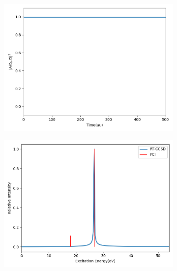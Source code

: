 \begin{figure}
     \centering
     \begin{subfigure}{0.47\textwidth}
         \centering
         \includegraphics[width=\textwidth]{ch4/Figs/10-1.png}
     \end{subfigure}
     \hfill
     \begin{subfigure}{0.47\textwidth}
         \centering
         \includegraphics[width=\textwidth]{ch4/Figs/10-2.png}
      \end{subfigure}
       \vfill
     \begin{subfigure}{0.47\textwidth}
         \centering

\end{subfigure}
\end{figure}
